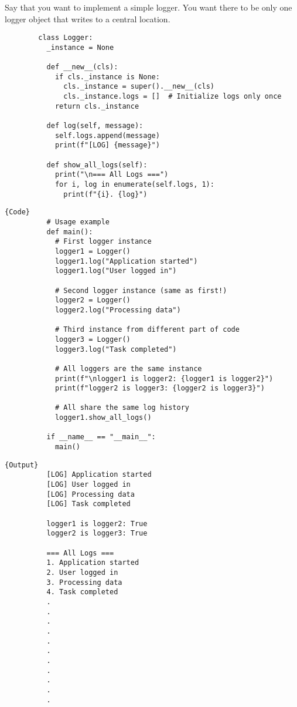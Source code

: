     \begin{example}[Logger]
      Say that you want to implement a simple logger. You want there to be only one logger object that writes to a central location. 

      \begin{lstlisting}
        class Logger:
          _instance = None
          
          def __new__(cls):
            if cls._instance is None:
              cls._instance = super().__new__(cls)
              cls._instance.logs = []  # Initialize logs only once
            return cls._instance
          
          def log(self, message):
            self.logs.append(message)
            print(f"[LOG] {message}")
          
          def show_all_logs(self):
            print("\n=== All Logs ===")
            for i, log in enumerate(self.logs, 1):
              print(f"{i}. {log}")
      \end{lstlisting}

      \noindent\begin{minipage}{.65\textwidth}
        \begin{lstlisting}[]{Code}
          # Usage example
          def main():
            # First logger instance
            logger1 = Logger()
            logger1.log("Application started")
            logger1.log("User logged in")
            
            # Second logger instance (same as first!)
            logger2 = Logger()
            logger2.log("Processing data")
            
            # Third instance from different part of code
            logger3 = Logger()
            logger3.log("Task completed")
            
            # All loggers are the same instance
            print(f"\nlogger1 is logger2: {logger1 is logger2}")
            print(f"logger2 is logger3: {logger2 is logger3}")
            
            # All share the same log history
            logger1.show_all_logs()

          if __name__ == "__main__":
            main() 
        \end{lstlisting}
        \end{minipage}
        \hfill
        \begin{minipage}{.34\textwidth}
        \begin{lstlisting}[]{Output}
          [LOG] Application started
          [LOG] User logged in
          [LOG] Processing data
          [LOG] Task completed

          logger1 is logger2: True
          logger2 is logger3: True

          === All Logs ===
          1. Application started
          2. User logged in
          3. Processing data
          4. Task completed
          .
          .
          .
          .
          .
          .
          .
          .
          .
          .
          .
        \end{lstlisting}
      \end{minipage}
    \end{example}

